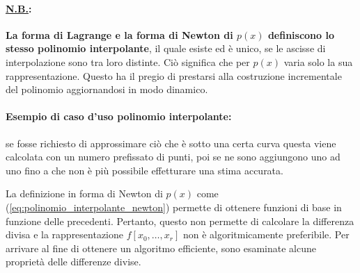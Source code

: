 \paragraph{\ul{N.B.}:} \textbf{La forma di Lagrange e la forma di Newton di $p(x)$ definiscono lo stesso polinomio interpolante}, il quale esiste ed è unico, se le ascisse di interpolazione sono tra loro distinte. Ciò significa che per $p(x)$ varia solo la sua rappresentazione. Questo ha il pregio di prestarsi alla costruzione incrementale del polinomio aggiornandosi in modo dinamico.

\paragraph{Esempio di caso d'uso polinomio interpolante:} se fosse richiesto di approssimare ciò che è sotto una certa curva questa viene calcolata con un numero prefissato di punti, poi se ne sono aggiungono uno ad uno fino a che non è più possibile effetturare una stima accurata.

La definizione in forma di Newton di $p(x)$ come (\ref{eq:polinomio_interpolante_newton}) permette di ottenere funzioni di base in funzione delle precedenti. Pertanto, questo non permette di calcolare la differenza divisa e la rappresentazione $f[x_0,\hdots, x_r]$ non è algoritmicamente preferibile. Per arrivare al fine di ottenere un algoritmo efficiente, sono esaminate alcune proprietà delle differenze divise.

